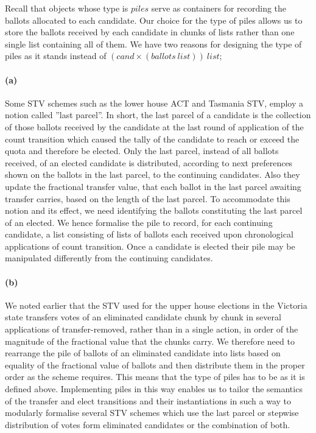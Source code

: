 \documentclass[10pt,conference]{IEEEtran}
\begin{document}
 Recall that objects whose type is $\mathit{piles}$ serve as
 containers for recording the ballots allocated to each candidate.
 Our choice for the  type of piles allows us to store the ballots received by each candidate in chunks of lists rather than one single list containing all of them.  We have two reasons for designing the type of piles as it stands instead of $\mathit{(cand\times(ballots~list))~list}$;  
\paragraph*{(a)} Some STV schemes such as the lower house ACT and
Tasmania STV, employ a notion called ''last parcel''. In short, the
last parcel of a candidate is the collection of those ballots
received by the candidate at the last round of application of the
count transition which caused the tally of the candidate to reach or
exceed the quota and therefore be elected.  Only the last parcel,
instead of all ballots received, of an elected candidate is distributed, according to next preferences shown on the ballots in the last parcel, to the continuing candidates.
 Also  they update the fractional transfer value, that each ballot in the last parcel  awaiting transfer carries, based on the length of the last parcel. To  accommodate this notion and its effect, we need identifying the ballots constituting the last parcel of an elected. We hence formalise the pile to record, for each  continuing candidate, a list consisting of lists of ballots each received upon  chronological applications of count transition.  Once a candidate is elected their pile may be manipulated differently from the continuing candidates. 
\paragraph*{(b)} We noted earlier that the STV used for the upper house elections in the Victoria state transfers votes of an eliminated candidate chunk by chunk in several applications of transfer-removed, rather than in a single action, in order of the magnitude of the fractional value that the chunks carry. We therefore need to rearrange the pile of ballots of an eliminated candidate into lists based on equality of the fractional value of ballots and then distribute them in the proper order as the scheme requires. This means that the type of piles has to be as it is defined above.   
Implementing piles in this way enables us to tailor the semantics of the transfer and elect transitions and their instantiations in such a way to modularly formalise several STV schemes which use the last parcel or stepwise distribution of votes form eliminated candidates or the combination of both. 
\end{document}
